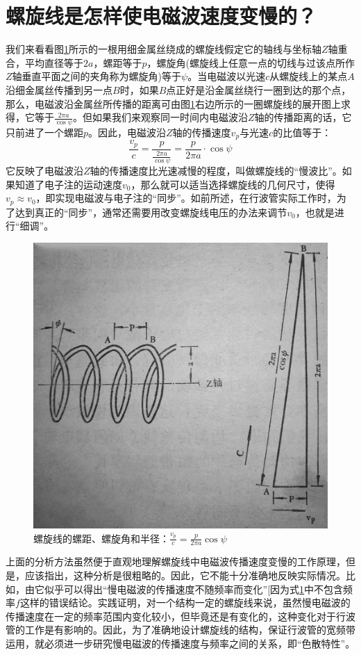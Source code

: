\section{螺旋线是怎样使电磁波速度变慢的？}
我们来看看图\ref{ch3-1}所示的一根用细金属丝绕成的螺旋线假定它的轴线与坐标轴$ Z $轴重合，平均直径等于$ 2a $，螺距等于$ p $，螺旋角(螺旋线上任意一点的切线与过该点所作$ Z $轴垂直平面之间的夹角称为螺旋角)等于$ \psi $。当电磁波以光速$ c $从螺旋线上的某点$ A $沿细金属丝传播到另一点$ B $时，如果$ B $点正好是沿金属丝绕行一圈到达的那个点，那么，电磁波沿金属丝所传播的距离可由图\ref{ch3-1}右边所示的一圈螺旋线的展开图上求得，它等于$\frac{2\pi a}{\cos \psi} $。但如果我们来观察同一时间内电磁波沿$ Z $轴的传播距离的话，它只前进了一个螺距$ p $。因此，电磁波沿$ Z $轴的传播速度$ v_p $与光速$ c $的比值等于：
\begin{equation}
	\frac{v_p}{c} = \frac{p}{\frac{2\pi a}{\cos \psi}} = \frac{p}{2\pi a}\cdot \cos\psi
\end{equation}
它反映了电磁波沿$ Z $轴的传播速度比光速减慢的程度，叫做螺旋线的“慢波比”。如果知道了电子注的运动速度$ v_0 $，那么就可以适当选择螺旋线的几何尺寸，使得$ v_p \approx v_0 $，即实现电磁波与电子注的“同步”。如前所述，在行波管实际工作时，为了达到真正的“同步”，通常还需要用改变螺旋线电压的办法来调节$ v_0 $，也就是进行“细调”。
\begin{figure}[phtb]
	\centering
	\includegraphics[width=0.65\linewidth]{figure/ch3-1}
	\caption{螺旋线的螺距、螺旋角和半径：$ \frac{v_p}{c} = \frac{p}{2\pi a} \cos \psi$}
	\label{ch3-1}
\end{figure}

上面的分析方法虽然便于直观地理解螺旋线中电磁波传播速度变慢的工作原理，但是，应该指出，这种分析是很粗略的。因此，它不能十分准确地反映实际情况。比如，由它似乎可以得出“慢电磁波的传播速度不随频率而变化”[因为式\ref{ch3-1}中不包含频率$ f $这样的错误结论。实践证明，对一个结构一定的螺旋线来说，虽然慢电磁波的传播速度在一定的频率范围内变化较小，但毕竟还是有变化的，这种变化对于行波管的工作是有影响的。因此，为了准确地设计螺旋线的结构，保证行波管的宽频带运用，就必须进一步研究慢电磁波的传播速度与频率之间的关系，即“色散特性”。



